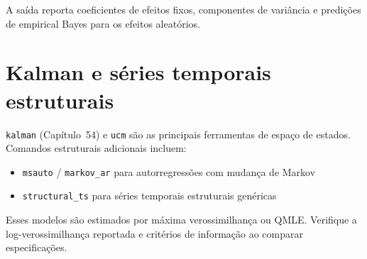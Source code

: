 A saída reporta coeficientes de efeitos fixos, componentes de variância
e predições de empirical Bayes para os efeitos aleatórios.

\section{Kalman e séries temporais estruturais}

\texttt{kalman} (Capítulo~54) e \texttt{ucm} são as principais ferramentas de
espaço de estados. Comandos estruturais adicionais incluem:

\begin{itemize}
\item \texttt{msauto} / \texttt{markov\_ar} para autorregressões com mudança de Markov
\item \texttt{structural\_ts} para séries temporais estruturais genéricas
\end{itemize}

Esses modelos são estimados por máxima verossimilhança ou QMLE. Verifique
a log-verossimilhança reportada e critérios de informação ao comparar
especificações.
